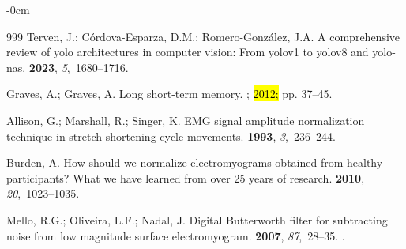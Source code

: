 \documentclass[actuators,article,accept,pdftex,moreauthors]{Definitions/mdpi}
\begin{document}
\begin{adjustwidth}{-\extralength}{0cm}
\begin{thebibliography}{999}
Terven, J.; C{\'o}rdova-Esparza, D.M.; Romero-Gonz{\'a}lez, J.A.
\newblock A comprehensive review of yolo architectures in computer vision: From
  yolov1 to yolov8 and yolo-nas.
 {\bf 2023}, {\em
  5},~1680--1716.

Graves, A.; Graves, A.
\newblock Long short-term memory.
; 
  \hl{ 2012;} %
 pp. 37--45.

Allison, G.; Marshall, R.; Singer, K.
\newblock EMG signal amplitude normalization technique in stretch-shortening
  cycle movements.
 {\bf 1993}, {\em
  3},~236--244.

Burden, A.
\newblock How should we normalize electromyograms obtained from healthy
  participants? What we have learned from over 25 years of research.
 {\bf 2010}, {\em
  20},~1023--1035.

Mello, R.G.; Oliveira, L.F.; Nadal, J.
\newblock Digital Butterworth filter for subtracting noise from low magnitude
  surface electromyogram.
 {\bf 2007}, {\em
  87},~28--35.
.

\end{thebibliography}





\end{adjustwidth}
\end{document}
